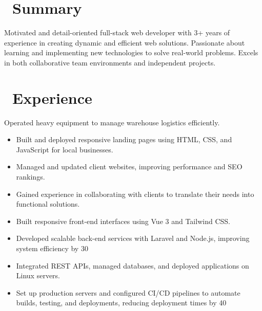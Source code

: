 \documentclass{resume}
\begin{document}



\section{\faUser\ Summary}
Motivated and detail-oriented full-stack web developer with 3+ years of experience in creating dynamic and efficient web solutions. Passionate about learning and implementing new technologies to solve real-world problems. Excels in both collaborative team environments and independent projects.

\vspace{1em}

\section{\faUsers\ Experience}
Operated heavy equipment to manage warehouse logistics efficiently.

\vspace{1em}

\begin{itemize}
  \item Built and deployed responsive landing pages using HTML, CSS, and JavaScript for local businesses.
  \item Managed and updated client websites, improving performance and SEO rankings.
  \item Gained experience in collaborating with clients to translate their needs into functional solutions.
\end{itemize}

\vspace{1em}

\begin{itemize}
\item Built responsive front-end interfaces using Vue 3 and Tailwind CSS.
  \item Developed scalable back-end services with Laravel and Node.js, improving system efficiency by 30%
  \item Integrated REST APIs, managed databases, and deployed applications on Linux servers.
  \item Set up production servers and configured CI/CD pipelines to automate builds, testing, and deployments, reducing deployment times by 40%
\end{itemize}
\end{document}
